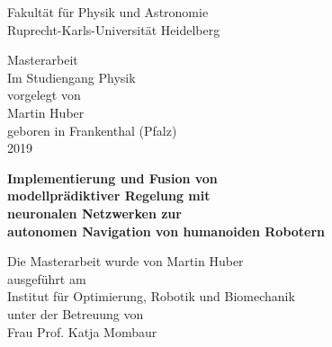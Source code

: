 
\thispagestyle{empty}
\begin{center}
  \renewcommand{\baselinestretch}{2.00}
  \Large\sffamily
  Fakult\"{a}t f\"{u}r Physik und Astronomie\\
  \large
  Ruprecht-Karls-Universit\"{a}t Heidelberg
  \par\vfill\normalfont
  Masterarbeit\\
  Im Studiengang Physik\\
  vorgelegt von\\
  Martin Huber\\
  geboren in Frankenthal (Pfalz)\\
  2019\\
\end{center}

\afterpage{\blankpage}
\newpage
\thispagestyle{empty}
\begin{center}
  \renewcommand{\baselinestretch}{2.00}
  \Large\bfseries\sffamily
    Implementierung und Fusion von \\
    modellprädiktiver Regelung mit \\
    neuronalen Netzwerken zur \\ 
    autonomen Navigation von humanoiden Robotern
  \par
  \vfill
  \large\normalfont
  Die Masterarbeit wurde von Martin Huber\\
  ausgeführt am\\
  Institut für Optimierung, Robotik und Biomechanik\\
  unter der Betreuung von\\
  Frau Prof. Katja Mombaur
\end{center}\par
\vspace{5\baselineskip}

\renewcommand{\baselinestretch}{1.00}\normalsize